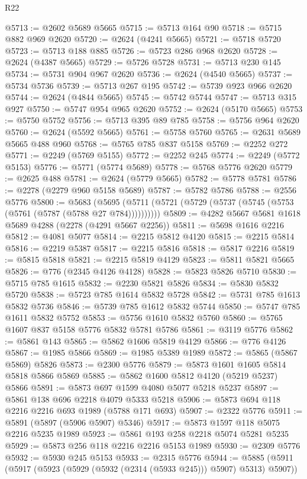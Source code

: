 \begin{lexlean}{R22}
\begin{coremodule}
@5713 := @2602 @5689 @5665
@5715 := @5713 @164 @90
@5718 := @5715 @882 @969 @2620
@5720 := @2624 (@4241 @5665)
@5721 := @5718 @5720
@5723 := @5713 @188 @885
@5726 := @5723 @286 @968 @2620
@5728 := @2624 (@4387 @5665)
@5729 := @5726 @5728
@5731 := @5713 @230 @145
@5734 := @5731 @904 @967 @2620
@5736 := @2624 (@4540 @5665)
@5737 := @5734 @5736
@5739 := @5713 @267 @195
@5742 := @5739 @923 @966 @2620
@5744 := @2624 (@4844 @5665)
@5745 := @5742 @5744
@5747 := @5713 @315 @927
@5750 := @5747 @954 @965 @2620
@5752 := @2624 (@5170 @5665)
@5753 := @5750 @5752
@5756 := @5713 @395 @89 @785
@5758 := @5756 @964 @2620
@5760 := @2624 (@5592 @5665)
@5761 := @5758 @5760
@5765 := @2631 @5689 @5665 @488 @960
@5768 := @5765 @785 @837 @5158
@5769 := @2252 @272
@5771 := @2249 (@5769 @5155)
@5772 := @2252 @245
@5774 := @2249 (@5772 @5153)
@5776 := @5771 (@5774 @5689)
@5778 := @5768 @5776 @2620
@5779 := @2625 @488
@5781 := @2624 (@5779 @5665)
@5782 := @5778 @5781
@5786 := @2278 (@2279 @960 @5158 @5689)
@5787 := @5782 @5786
@5788 := @2556 @5776
@5800 := @5683
    (@5695 (@5711 (@5721 (@5729 (@5737 (@5745 (@5753 (@5761 (@5787 (@5788 @27 @784))))))))))
@5809 := @4282 @5667 @5681 @1618 @5689 @4288 (@2278 (@4291 @5667 @2256))
@5811 := @5698 @1616 @2216
@5812 := @4081 @5077
@5814 := @2215 @5812 @4120
@5815 := @2215 @5814
@5816 := @2219 @5387
@5817 := @2215 @5816
@5818 := @5817 @2216
@5819 := @5815 @5818
@5821 := @2215 @5819 @4129
@5823 := @5811 @5821 @5665
@5826 := @776 (@2345 @4126 @4128)
@5828 := @5823 @5826 @5710
@5830 := @5715 @785 @1615
@5832 := @2230 @5821 @5826
@5834 := @5830 @5832 @5720
@5838 := @5723 @785 @1614 @5832 @5728
@5842 := @5731 @785 @1613 @5832 @5736
@5846 := @5739 @785 @1612 @5832 @5744
@5850 := @5747 @785 @1611 @5832 @5752
@5853 := @5756 @1610 @5832 @5760
@5860 := @5765 @1607 @837 @5158 @5776 @5832 @5781 @5786
@5861 := @3119 @5776
@5862 := @5861 @143
@5865 := @5862 @1606 @5819 @4129
@5866 := @776 @4126
@5867 := @1985 @5866
@5869 := @1985 @5389 @1989
@5872 := @5865 (@5867 @5869) @5826
@5873 := @2300 @5776
@5879 := @5873 @1601 @1605 @5814 @5818 @5866 @5869
@5885 := @5862 @1600 @5812 @4120 (@5219 @5237) @5866
@5891 := @5873 @697 @1599 @4080 @5077 @5218 @5237
@5897 := @5861 @138 @696 @2218 @4079 @5333 @5218
@5906 := @5873 @694 @118 @2216 @2216 @693 @1989 (@5788 @171 @693)
@5907 := @2322 @5776
@5911 := @5891 (@5897 (@5906 @5907) @5346)
@5917 := @5873 @1597 @118 @5075 @2216 @5235 @1989
@5923 := @5861 @193 @258 @2218 @5074 @5281 @5235
@5929 := @5873 @256 @118 @2216 @2216 @5153 @1989
@5930 := @2309 @5776
@5932 := @5930 @245 @5153
@5933 := @2315 @5776
@5944 := @5885 (@5911 (@5917 (@5923 (@5929 (@5932 (@2314 (@5933 @245))) @5907) @5313) @5907))

\end{coremodule}
\end{lexlean}
